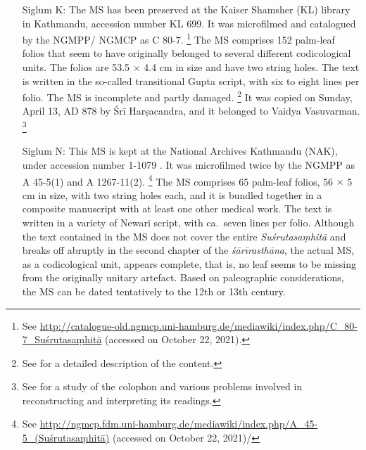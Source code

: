 \begin{itemize}
\item[Siglum K:] The MS has been preserved at the Kaiser Shamsher (KL) library in Kathmandu, accession number KL 699. It was microfilmed and catalogued by the NGMPP/ NGMCP as C 80-7.%
    \footnote{%
    See \href{http://catalogue-old.ngmcp.uni-hamburg.de/mediawiki/index.php/C_80-7_Suśrutasaṃhitā}{http://catalogue-old.ngmcp.uni-hamburg.de/mediawiki/index.php/C_80-7_Suśrutasaṃhitā} (accessed on October 22, 2021).%
    } 
The MS comprises 152 palm-leaf folios that seem to have originally belonged to several different codicological units. The folios are 53.5 $\times$ 4.4 cm in size and have two string holes.  The text is written in the so-called transitional Gupta script, with six to eight lines per folio. The MS is incomplete and partly damaged.%
    \footnote{%
    See \textcites[11]{kleb-2021b} for a detailed description of the content.%
    }
It was copied on Sunday, April 13, AD 878 by Śrī Harṣacandra, and it belonged to Vaidya Vasuvarman.%
    \footnote{%
    See \textcites[13--17]{kleb-2021b} for a study of the colophon and various problems involved in reconstructing and interpreting its readings.%
    }

\item[Siglum N:] This MS is kept at the National Archives Kathmandu (NAK), under accession number 1-1079 . It was microfilmed twice by the NGMPP as A 45-5(1) and A 1267-11(2).%
    \footnote{%
See \href{http://ngmcp.fdm.uni-hamburg.de/mediawiki/index.php/A_45-5_(Suśrutasaṃhitā)}{http://ngmcp.fdm.uni-hamburg.de/mediawiki/index.php/A_45-5_(Suśrutasaṃhitā)} (accessed on October 22, 2021)/
    } 
The MS comprises 65 palm-leaf folios, 56 $\times$ 5 cm in size, with two string holes each, and it is bundled together in a composite manuscript with at least one other medical work. The text is written in a variety of Newari script, with ca.\ seven lines per folio. Although the text contained in the MS does not cover the entire \emph{Suśrutasaṃhitā} and breaks off abruptly in the second chapter of the \emph{śārīrasthāna}, the actual MS, as a codicological unit, appears complete, that is, no leaf seems to be missing from the originally unitary artefact. Based on paleographic considerations, the MS can be dated tentatively to the 12th or 13th century.


\end{itemize}
